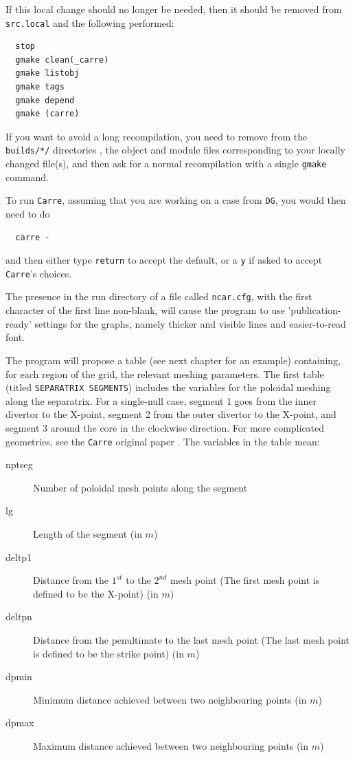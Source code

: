\documentclass[a4paper,10pt]{report}
\begin{document}
If this local change should no longer
be needed, then it should be removed from {\tt src.local} and the
following performed:
\begin{verbatim}
  stop
  gmake clean(_carre)
  gmake listobj
  gmake tags
  gmake depend
  gmake (carre)
\end{verbatim}
If you want to avoid a long recompilation, you need to remove from the {\tt builds/*/}
directories , the object and module files corresponding to your locally changed file(s),
and then ask for a normal recompilation with a single {\tt gmake} command.

To run {\tt Carre}, assuming that you are working on a case from {\tt DG},
you would then need to do
\begin{verbatim}
  carre -
\end{verbatim}
and then either type {\tt return} to accept the default, or a {\tt y} if
asked to accept {\tt Carre}'s choices.

The presence in the run directory of a file called {\tt ncar.cfg}, with the
first character of the first line non-blank, will cause the program to use
'publication-ready' settings for the graphs, namely thicker and visible lines
and easier-to-read font. 

The program will propose a table (see next chapter for an example) containing,
for each
region of the grid, the relevant meshing parameters. The first table
(titled {\tt SEPARATRIX SEGMENTS}) includes the variables for the poloidal
meshing along the separatrix. For a single-null case, segment 1 goes from
the inner divertor to the X-point, segment 2 from the outer divertor to
the X-point, and segment 3 around the core in the clockwise direction.
For more complicated geometries, see the {\tt Carre} original paper
\cite{Marchand1996}. The variables in the table mean:

\begin{description}
  \item[nptseg] Number of poloidal mesh points along the segment
  \item[lg] Length of the segment (in $m$)
  \item[deltp1] Distance from the $1^{st}$ to the $2^{nd}$ mesh point (The first mesh point is defined to be the X-point) (in $m$)
  \item[deltpn] Distance from the penultimate to the last mesh point (The last mesh point is defined to be the strike point) (in $m$)
  \item[dpmin] Minimum distance achieved between two neighbouring points (in $m$)
  \item[dpmax] Maximum distance achieved between two neighbouring points (in $m$)
\end{description}
\end{document}

